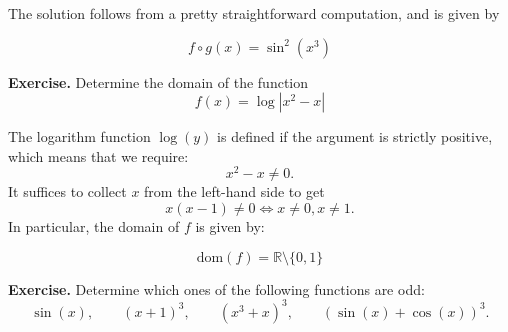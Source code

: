 \documentclass[a4paper,10 pt]{report}
\newcommand{\finalanswer}[1]{%
    \begin{finalAnswer}
    \[
        #1
    \]
    \end{finalAnswer}
}
\theoremstyle{definition}
\newcommand{\R}{\mathbb R}
\begin{document}
\begin{solutionBox}The solution follows from a pretty straightforward computation, and is given by
\finalanswer{f \circ g(x) = \sin^2(x^3)}
\end{solutionBox}

\begin{exerciseBox}
\textbf{Exercise.} Determine the domain of the function
\[
f(x) = \log |x^2 - x|
\]
\end{exerciseBox}

\begin{solutionBox}
The logarithm function $\log(y)$ is defined if the argument is strictly positive, which means that we require:
\[
x^2 - x \neq 0.
\]
It suffices to collect $x$ from the left-hand side to get
\[
x(x-1) \neq 0 \iff x \neq 0, x \neq 1.
\]
In particular, the domain of $f$ is given by:
	\finalanswer{\mathrm{dom} (f) = \R \setminus \{0, 1\}}
\end{solutionBox}


\begin{exerciseBox}
\textbf{Exercise.} Determine which ones of the following functions are odd:
\begin{equation*}\sin(x), \qquad (x + 1)^3, \qquad (x^3 + x)^3, \qquad (\sin(x) + \cos(x))^3. \end{equation*}
\end{exerciseBox}
\end{document}
